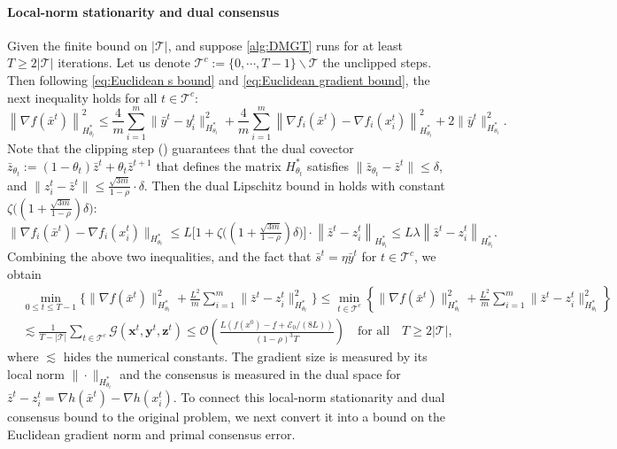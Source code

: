 \documentclass{article}
\theoremstyle{plain}
\theoremstyle{definition}
\theoremstyle{remark}
\newcommand{\sL}{L}
\newcommand{\cO}{\mathcal O}
\newcommand{\cE}{\mathcal E}
\newcommand{\bx}{\mathbf{x}}
\newcommand{\by}{\mathbf{y}}
\newcommand{\bz}{\mathbf{z}}
\begin{document}
\paragraph{Local-norm stationarity and dual consensus}
Given the finite bound on $|\mathcal{T}|$, and suppose \cref{alg:DMGT} runs for at least $T\geq 2|\mathcal{T}|$ iterations. Let us denote $\mathcal{T}^c:=\{0,\cdots,T-1\}\backslash\mathcal{T}$ the unclipped steps. Then following \eqref{eq:Euclidean s bound} and \eqref{eq:Euclidean gradient bound}, the next inequality holds for all $t\in\mathcal{T}^c$:
\begin{equation*} 
\left\|\nabla f(\bar x^t)\right\|^2_{H_{\theta_t}^*} \leq \frac{4}{m}{\sum}_{i=1}^m\| \bar y^t - y_i^t \|^2_{H_{\theta_t}^*} + \frac{4}{m}{\sum}_{i=1}^m\left\|\nabla f_i(\bar x^t) - \nabla f_i(x^t_i)\right\|^2_{H_{\theta_t}^*} + 2\|\bar{y}^t\|^2_{H_{\theta_t}^*}. 
\end{equation*}
Note that the clipping step () guarantees that the dual covector $\bar{z}_{\theta_t}:=(1-\theta_t)\bar{z}^t+\theta_t\bar{z}^{t+1}$ that defines the matrix $H^*_{\theta_t}$ satisfies $\|\bar{z}_{\theta_t}-\bar{z}^t\|\leq \delta$, and $\|z_i^{t}-\bar{z}^t\|\leq\frac{\sqrt{3m}}{1-\rho}\cdot\delta$. Then the dual Lipschitz bound in  holds with constant $\zeta\big((1+\frac{\sqrt{3m}}{1-\rho})\delta\big)$:   
\begin{equation*} 
    \| \nabla f_i(\bar{x}^t) - \nabla f_i(x_i^t) \|_{H^*_{\theta_t}} \leq \sL \Big[1+\zeta\big((1+\tfrac{\sqrt{3m}}{1-\rho})\delta\big)\Big] \cdot \left\| \bar{z}^t - z_i^t \right\|_{H^*_{\theta_t}}\leq \sL \lambda \left\| \bar{z}^t - z_i^t \right\|_{H^*_{\theta_t}}. 
\end{equation*}
Combining the above two inequalities, and the fact that  $\bar{s}^t = \eta\bar{y}^t$ for $t\in\mathcal{T}^c$, we obtain  
\begin{equation*}
\begin{aligned}
    & \min_{0\leq t\leq T-1} \!\bigg\{\!\|\nabla f(\bar{x}^{t})\|^2_{H^*_{\theta_t}} + \frac{\sL^2}{m}{\sum}_{i=1}^m\|\bar{z}^t-z_i^t\|^2_{H^*_{\theta_t}}\!\bigg\} \leq \min_{t\in\mathcal{T}^c} \left\{\!\|\nabla f(\bar{x}^{t})\|^2_{H^*_{\theta_t}} + \frac{\sL^2}{m}{\sum}_{i=1}^m\|\bar{z}^t-z_i^t\|^2_{H^*_{\theta_t}}\right\}\\
& \lesssim \frac{1}{T-|\mathcal{T}|}\sum_{t\in\mathcal{T}^c}  \mathcal{G}(\bx^t,\by^t,\bz^t) \leq  \cO\left(\frac{\sL(f(x^0)- \underline{f}{}+\cE_0/(8\sL))}{(1-\rho)^{3}T}\right) \quad\mbox{for all}\quad T\geq 2|\mathcal{T}|,    
\end{aligned}
\end{equation*}
%
where $\lesssim$ hides the numerical constants. The gradient size is measured by its local norm $\|\cdot\|_{H^*_{\theta_t}}$ and the consensus is measured in the dual space for $\bar{z}^t-z_i^t = \nabla h(\bar{x}^t)-\nabla h(x_i^t)$. To connect this local-norm stationarity and dual consensus bound to the original problem, we next convert it into a bound on the Euclidean gradient norm and primal consensus error. 
\end{document}
